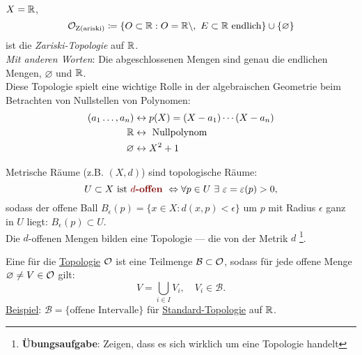 \begin{example}
  \label{bsp:zariskitopologie}
  $ X = \mathbb{R} $,
  \begin{equation*}
    \mathcal{O}_\text{Z(ariski)} \coloneqq \{ O \subset \mathbb{R} : O = \mathbb{R} \setminus, \ E \subset \mathbb{R} \text{ endlich} \} \cup \{ \varnothing \}
  \end{equation*}
  ist die \emph{Zariski-Topologie} auf $ \mathbb{R} $. \\
  \emph{Mit anderen Worten}: Die abgeschlossenen Mengen sind genau die endlichen Mengen, $ \varnothing $ und $ \mathbb{R} $. \\
  Diese Topologie spielt eine wichtige Rolle in der algebraischen Geometrie beim Betrachten von Nullstellen von Polynomen: \\
  \begin{align*}
    (a_1 \dots, a_n) &\leftrightarrow p(X) = (X-a_1)\cdots(X-a_n) \\
     \mathbb{R} &\leftrightarrow \text{ Nullpolynom} \\
     \varnothing &\leftrightarrow X^2+1
  \end{align*}
\end{example}

\begin{definition}
  Metrische Räume (z.B. $ (X, d) $) sind topologische Räume: \\
  \begin{equation*}
    U \subset X \text{ ist \term{$ d $-offen} } \Leftrightarrow \forall p \in U \ \exists \ \epsilon = \epsilon(p) > 0\text{,}
  \end{equation*}
  sodass der offene Ball $ B_\epsilon(p) = \{ x \in X : d(x,p) < \epsilon \} $ um $ p $ mit Radius $ \epsilon $ ganz in $ U $ liegt: $ B_\epsilon(p) \subset U $. \\
  Die $ d $-offenen Mengen bilden eine Topologie --- die von der Metrik $ d $ \footnote{\textbf{Übungsaufgabe}: Zeigen, dass es sich wirklich um eine Topologie handelt}.
\end{definition}

\begin{definition}[Basis]
  \label{def:basis}
  Eine  für die \hyperref[def:topologie]{Topologie} $ \mathcal{O} $ ist eine Teilmenge $ \mathcal{B} \subset \mathcal{O} $, sodass für jede offene Menge $ \varnothing \neq V \in \mathcal{O} $ gilt:
  \begin{equation*}
    V = \bigcup_{i \in I}V_i, \quad V_i \in \mathcal{B}\text{.}
  \end{equation*}
  \underline{Beispiel}: $ \mathcal{B} = \{ \text{offene Intervalle} \} $ für \hyperref[bsp:standardtopologie]{Standard-Topologie} auf $ \mathbb{R} $.
\end{definition}

